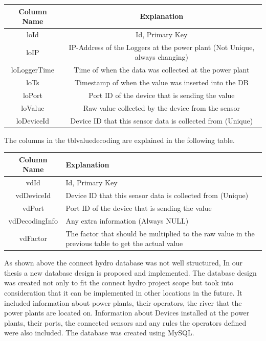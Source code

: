 \begin{center}
\begin{tabular}{ |c|c| } 
 \hline
 Column Name & Explanation\\ [0.5ex] 
 \hline\hline
loId & Id, Primary Key\\ 
\hline
loIP & IP-Address of the Loggers at the power plant (Not Unique, always changing)\\ 
\hline
loLoggerTime & Time of when the data was collected at the power plant\\ 
\hline
loTs & Timestamp of when the value was inserted into the DB\\ 
\hline
loPort & Port ID of the device that is sending the value\\ 
\hline
loValue & Raw value collected by the device from the sensor\\
\hline
loDeviceId & Device ID that this sensor data is collected from (Unique)\\
 \hline
\end{tabular}
\end{center}
The columns in the tblvaluedecoding are explained in the following table.
\begin{center}
\begin{tabular}{ |c|p{10cm}| } 
 \hline
 Column Name & Explanation\\ [0.5ex] 
 \hline\hline
vdId & Id, Primary Key\\ 
\hline
vdDeviceId & Device ID that this sensor data is collected from (Unique)\\
\hline
vdPort & Port ID of the device that is sending the value\\ 
\hline
vdDecodingInfo & Any extra information (Always NULL)\\
\hline
vdFactor & The factor that should be multiplied to the raw value in the previous table to get the actual value\\ 
 \hline
\end{tabular}
\end{center}
As shown above the connect hydro database was not well structured, In our thesis a new database design is proposed and implemented. The database design was created not only to fit the connect hydro project scope but took into consideration that it can be implemented in other locations in the future. It included information about power plants, their operators, the river that the power plants are located on. Information about Devices installed at the power plants, their ports, the connected sensors and any rules the operators defined were also included. The database was created using MySQL.

